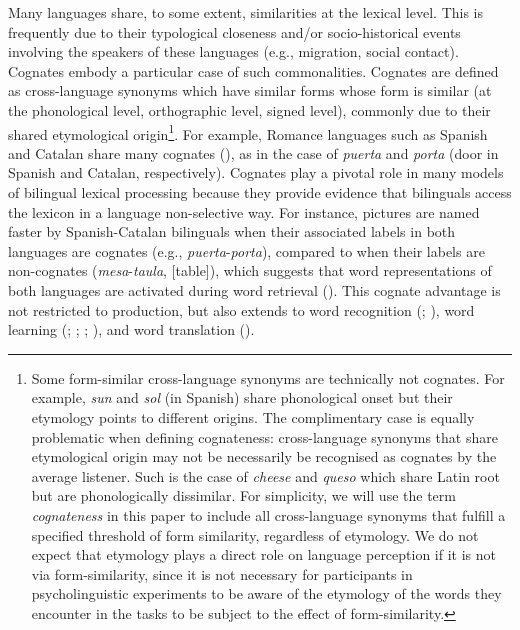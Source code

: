 \documentclass[
]{article}
\begin{document}
Many languages share, to some extent, similarities at the lexical level.
This is frequently due to their typological closeness and/or
socio-historical events involving the speakers of these languages (e.g.,
migration, social contact). Cognates embody a particular case of such
commonalities. Cognates are defined as cross-language synonyms which
have similar forms whose form is similar (at the phonological level,
orthographic level, signed level), commonly due to their shared
etymological origin\footnote{Some form-similar cross-language synonyms
  are technically not cognates. For example, \emph{sun} and \emph{sol}
  (in Spanish) share phonological onset but their etymology points to
  different origins. The complimentary case is equally problematic when
  defining cognateness: cross-language synonyms that share etymological
  origin may not be necessarily be recognised as cognates by the average
  listener. Such is the case of \emph{cheese} and \emph{queso} which
  share Latin root but are phonologically dissimilar. For simplicity, we
  will use the term \emph{cognateness} in this paper to include all
  cross-language synonyms that fulfill a specified threshold of form
  similarity, regardless of etymology. We do not expect that etymology
  plays a direct role on language perception if it is not via
  form-similarity, since it is not necessary for participants in
  psycholinguistic experiments to be aware of the etymology of the words
  they encounter in the tasks to be subject to the effect of
  form-similarity.}. For example, Romance languages such as Spanish and
Catalan share many cognates
(), as in
the case of \emph{puerta} and \emph{porta} (door in Spanish and Catalan,
respectively). Cognates play a pivotal role in many models of bilingual
lexical processing because they provide evidence that bilinguals access
the lexicon in a language non-selective way. For instance, pictures are
named faster by Spanish-Catalan bilinguals when their associated labels
in both languages are cognates (e.g., \emph{puerta}-\emph{porta}),
compared to when their labels are non-cognates
(\emph{mesa}-\emph{taula}, {[}table{]}), which suggests that word
representations of both languages are activated during word retrieval
(). This cognate
advantage is not restricted to production, but also extends to word
recognition (;
), word learning
(;
;
;
), and word
translation ().
\end{document}
